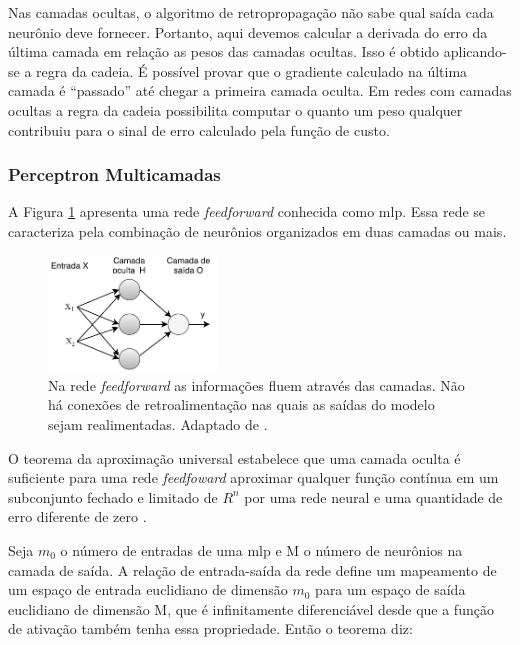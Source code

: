 Nas camadas ocultas, o algoritmo de retropropagação não sabe qual saída cada neurônio deve fornecer. Portanto, aqui devemos calcular a derivada do erro da última camada em relação as pesos das camadas ocultas. Isso é obtido aplicando-se a regra da cadeia. É possível provar que o gradiente calculado na última camada é ``passado'' até chegar a primeira camada oculta.    
Em redes com camadas ocultas a regra da cadeia possibilita computar o quanto um peso qualquer contribuiu para o sinal de erro calculado pela função de custo.  

\subsubsection{Perceptron Multicamadas}

A Figura \ref{fig:feedforward} apresenta uma rede \textit{feedforward} conhecida como \gls{mlp}. Essa rede se caracteriza pela combinação de neurônios organizados em duas camadas ou mais. 

\begin{figure}[h]
	\centering
	\includegraphics[width=0.4\textwidth]{figuras/feedforward.pdf}
	\caption[Rede \textit{feedforward} de 2 camadas]{Na rede \textit{feedforward} as informações fluem através das camadas. Não há conexões de retroalimentação nas quais as saídas do modelo sejam realimentadas. Adaptado de \cite{Goodfellow2016}.}
	\label{fig:feedforward}
\end{figure}


O teorema da aproximação universal \cite{hornik1989multilayer} estabelece que uma camada oculta é suficiente para uma rede \textit{feedfoward} aproximar qualquer função contínua em um subconjunto fechado e limitado de $R^{n}$ por uma rede neural e uma quantidade de erro diferente de zero \cite{Goodfellow2016}.

Seja $m_{0}$ o número de entradas de uma \acrshort{mlp} e M o número de neurônios na camada de saída. A relação de entrada-saída da rede define um mapeamento de um espaço de entrada euclidiano de dimensão $m_{0}$ para um espaço de saída euclidiano de dimensão M, que é infinitamente diferenciável desde que a função de ativação também tenha essa propriedade. Então o teorema diz:

